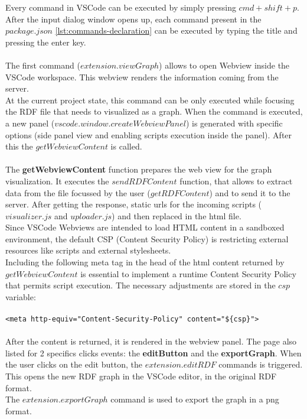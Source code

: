 	Every command in VSCode can be executed by simply pressing $cmd + shift + p$. After the input dialog window opens up, each command present in the $package.json$ \ref{lst:commands-declaration} can be executed by typing the title and pressing the enter key. 
	\\
	\\
	The first command ($extension.viewGraph$) allows to open Webview inside the VSCode workspace. This webview renders the information coming from the server. 
	\\
	At the current project state, this command can be only executed while focusing the RDF file that needs to visualized as a graph. 
	When the command is executed, a new panel ($vscode.window.createWebviewPanel$) is generated with specific options (side panel view and enabling scripts execution inside the panel).
	After this the $getWebviewContent$ is called. 
	\\
	\\
	The \textbf{getWebviewContent} function prepares the web view for the graph visualization. It executes the $sendRDFContent$ function, that allows to extract data from the file focussed by the user ($getRDFContent$) and to send it to the server. 
	After getting the response, static urls for the incoming scripts ($visualizer.js$ and $uploader.js$) and then replaced in the html file.
	\\
	Since VSCode Webviews are intended to load HTML content in a sandboxed environment, the default CSP (Content Security Policy) is restricting external resources like scripts and external stylesheets. 
	\\
	Including the following meta tag in the head of the html content returned by $getWebviewContent$ is essential to implement a runtime Content Security Policy that permits script execution. The necessary adjustments are stored in the $csp$ variable:
	\\
	\\
	\texttt{<meta http-equiv="Content-Security-Policy" content="\$\{csp\}">}
	\\
	\\
	After the content is returned, it is rendered in the webview panel. The page also listed for 2 specifics clicks events: the \textbf{editButton} and the \textbf{exportGraph}.
	When the user clicks on the edit button, the $extension.editRDF$ commands is triggered. This opens the new RDF graph in the VSCode editor, in the original RDF format. 
	\\
	The $extension.exportGraph$ command is used to export the graph in a png format.
